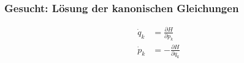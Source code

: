 \begin{frame}
    \frametitle{Gesucht: Lösung der kanonischen Gleichungen}
    
    \begin{align*}
        \dot{q}_k &= \frac{\partial H}{\partial p_k} \\
        \dot{p}_k &= -\frac{\partial H}{\partial q_k}
    \end{align*}
    
    
\end{frame}